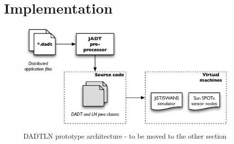 \chapter{Implementation} \label{chap:Implementation}

\begin{figure}
\centering
\label{Fig:DADTLN_architecture}
\includegraphics[scale=0.71]{img/DADTLN_architecture.eps} \caption[DADTLN
prototype architecture - to be renamed]{DADTLN prototype architecture - to
be moved to the other section}
\end{figure} 
